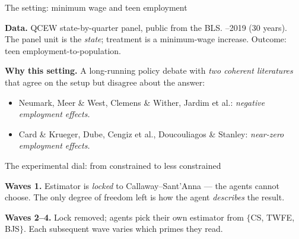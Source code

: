 \documentclass[aspectratio=169,12pt,t]{beamer}
\begin{document}
\begin{frame}{The setting: minimum wage and teen employment}
\vspace{0.3cm}

\textbf{Data.} \;QCEW state-by-quarter panel, public from the BLS. --2019 (30 years). \;The panel unit is the \textit{state}; treatment is a minimum-wage increase. \;Outcome: teen employment-to-population.

\vspace{0.4cm}

\textbf{Why this setting.} \;A long-running policy debate with \textit{two coherent literatures} that agree on the setup but disagree about the answer:
\begin{itemize}\small
  \item Neumark, Meer \& West, Clemens \& Wither, Jardim et al.: \;\textit{negative employment effects.}
  \item Card \& Krueger, Dube, Cengiz et al., Doucouliagos \& Stanley: \;\textit{near-zero employment effects.}
\end{itemize}

\vspace{0.3cm}
\end{frame}

\begin{frame}{The experimental dial: from constrained to less constrained}
\vspace{0.3cm}

\textbf{Waves 1.} \;Estimator is \textit{locked} to Callaway--Sant'Anna --- the agents cannot choose. \;The only degree of freedom left is how the agent \textit{describes} the result.

\vspace{0.5cm}

\textbf{Waves 2--4.} \;Lock removed; agents pick their own estimator from $\{$CS, TWFE, BJS$\}$. \;Each subsequent wave varies which primes they read.

\vspace{0.5cm}

\end{frame}
\end{document}
